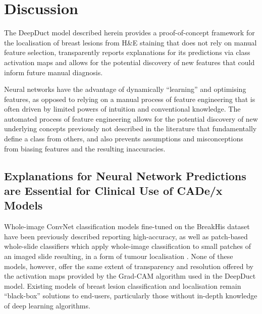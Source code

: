 \newpage
\section{Discussion}

The DeepDuct model described herein provides a proof-of-concept framework for the localisation of breast lesions from H\&E staining that does not rely on manual feature selection, transparently reports explanations for its predictions via class activation maps and allows for the potential discovery of new features that could inform future manual diagnosis.\par

Neural networks have the advantage of dynamically ``learning'' and optimising features, as opposed to relying on a manual process of feature engineering that is often driven by limited powers of intuition and conventional knowledge. The automated process of feature engineering allows for the potential discovery of new underlying concepts previously not described in the literature that fundamentally define a class from others, and also prevents assumptions and misconceptions from biasing features and the resulting inaccuracies.\par

\subsection{Explanations for Neural Network Predictions are Essential for Clinical Use of CADe/x Models}

Whole-image ConvNet classification models fine-tuned on the BreakHis dataset have been previously described reporting high-accuracy, as well as patch-based whole-slide classifiers which apply whole-image classification to small patches of an imaged slide resulting, in a form of tumour localisation \citep{han2017, wang2016}. None of these models, however, offer the same extent of transparency and resolution offered by the activation maps provided by the Grad-CAM algorithm used in the DeepDuct model. Existing models of breast lesion classification and localisation remain ``black-box'' solutions to end-users, particularly those without in-depth knowledge of deep learning algorithms.\par


